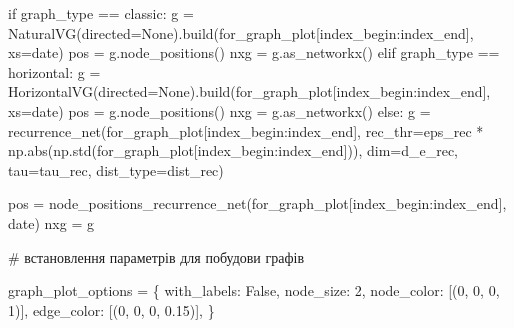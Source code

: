 \documentclass[
  letterpaper,
]{report}
\newenvironment{Shaded}{\begin{snugshade}}{\end{snugshade}}
\newcommand{\BuiltInTok}[1]{\textcolor[rgb]{0.00,0.23,0.31}{#1}}
\newcommand{\CommentTok}[1]{\textcolor[rgb]{0.37,0.37,0.37}{#1}}
\newcommand{\ControlFlowTok}[1]{\textcolor[rgb]{0.00,0.23,0.31}{#1}}
\newcommand{\DecValTok}[1]{\textcolor[rgb]{0.68,0.00,0.00}{#1}}
\newcommand{\FloatTok}[1]{\textcolor[rgb]{0.68,0.00,0.00}{#1}}
\newcommand{\NormalTok}[1]{\textcolor[rgb]{0.00,0.23,0.31}{#1}}
\newcommand{\OperatorTok}[1]{\textcolor[rgb]{0.37,0.37,0.37}{#1}}
\newcommand{\StringTok}[1]{\textcolor[rgb]{0.13,0.47,0.30}{#1}}
\newcommand{\VariableTok}[1]{\textcolor[rgb]{0.07,0.07,0.07}{#1}}
\begin{document}
\begin{Shaded}
\begin{Highlighting}[]
\ControlFlowTok{if}\NormalTok{ graph\_type }\OperatorTok{==} \StringTok{\textquotesingle{}classic\textquotesingle{}}\NormalTok{:}
\NormalTok{    g }\OperatorTok{=}\NormalTok{ NaturalVG(directed}\OperatorTok{=}\VariableTok{None}\NormalTok{).build(for\_graph\_plot[index\_begin:index\_end], xs}\OperatorTok{=}\NormalTok{date)}
\NormalTok{    pos }\OperatorTok{=}\NormalTok{ g.node\_positions()}
\NormalTok{    nxg }\OperatorTok{=}\NormalTok{ g.as\_networkx()}
\ControlFlowTok{elif}\NormalTok{ graph\_type }\OperatorTok{==} \StringTok{\textquotesingle{}horizontal\textquotesingle{}}\NormalTok{:}
\NormalTok{    g }\OperatorTok{=}\NormalTok{ HorizontalVG(directed}\OperatorTok{=}\VariableTok{None}\NormalTok{).build(for\_graph\_plot[index\_begin:index\_end], xs}\OperatorTok{=}\NormalTok{date)}
\NormalTok{    pos }\OperatorTok{=}\NormalTok{ g.node\_positions()}
\NormalTok{    nxg }\OperatorTok{=}\NormalTok{ g.as\_networkx()}
\ControlFlowTok{else}\NormalTok{:}
\NormalTok{    g }\OperatorTok{=}\NormalTok{ recurrence\_net(for\_graph\_plot[index\_begin:index\_end], }
\NormalTok{                       rec\_thr}\OperatorTok{=}\NormalTok{eps\_rec }\OperatorTok{*}\NormalTok{ np.}\BuiltInTok{abs}\NormalTok{(np.std(for\_graph\_plot[index\_begin:index\_end])), }
\NormalTok{                       dim}\OperatorTok{=}\NormalTok{d\_e\_rec, }
\NormalTok{                       tau}\OperatorTok{=}\NormalTok{tau\_rec, }
\NormalTok{                       dist\_type}\OperatorTok{=}\NormalTok{dist\_rec)}
    
\NormalTok{    pos }\OperatorTok{=}\NormalTok{ node\_positions\_recurrence\_net(for\_graph\_plot[index\_begin:index\_end], date)}
\NormalTok{    nxg }\OperatorTok{=}\NormalTok{ g}
    
    
\CommentTok{\# встановлення параметрів для побудови графів}

\NormalTok{graph\_plot\_options }\OperatorTok{=}\NormalTok{ \{}
    \StringTok{\textquotesingle{}with\_labels\textquotesingle{}}\NormalTok{: }\VariableTok{False}\NormalTok{,}
    \StringTok{\textquotesingle{}node\_size\textquotesingle{}}\NormalTok{: }\DecValTok{2}\NormalTok{,}
    \StringTok{\textquotesingle{}node\_color\textquotesingle{}}\NormalTok{: [(}\DecValTok{0}\NormalTok{, }\DecValTok{0}\NormalTok{, }\DecValTok{0}\NormalTok{, }\DecValTok{1}\NormalTok{)],}
    \StringTok{\textquotesingle{}edge\_color\textquotesingle{}}\NormalTok{: [(}\DecValTok{0}\NormalTok{, }\DecValTok{0}\NormalTok{, }\DecValTok{0}\NormalTok{, }\FloatTok{0.15}\NormalTok{)],}
\NormalTok{\}}
\end{Highlighting}
\end{Shaded}
\end{document}
